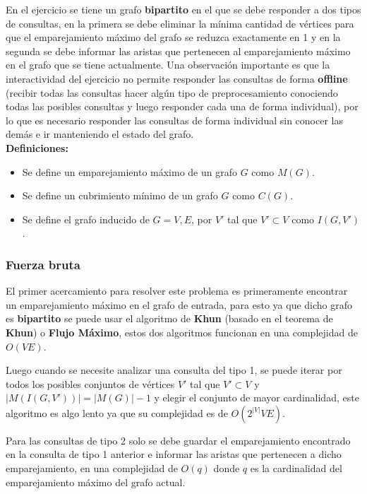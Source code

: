 \documentclass{article}
\begin{document}
En el ejercicio se tiene un grafo \textbf{bipartito} en el que se debe responder a dos tipos de consultas, en la primera
se debe eliminar la mínima cantidad de vértices para que el emparejamiento máximo del grafo se reduzca exactamente en 1 y
en la segunda se debe informar las aristas que pertenecen al emparejamiento máximo en el grafo que se tiene actualmente.
Una observación importante es que la interactividad del ejercicio no permite responder las consultas de forma \textbf{offline}
(recibir todas las consultas hacer algún tipo de preprocesamiento conociendo todas las posibles consultas y luego responder
cada una de forma individual), por lo que es necesario responder las consultas de forma individual sin conocer las demás e ir
manteniendo el estado del grafo.\\

\textbf{Definiciones:}

\begin{itemize}
    \item Se define un emparejamiento máximo de un grafo $G$ como $M(G)$.
    \item Se define un cubrimiento mínimo de un grafo $G$ como $C(G)$.
    \item Se define el grafo inducido de $G=V,E$, por $V'$ tal que $V'\subset V$ como $I(G,V')$.
\end{itemize}

\subsubsection{Fuerza bruta}

El primer acercamiento para resolver este problema es primeramente encontrar un emparejamiento máximo en el grafo de entrada,
para esto ya que dicho grafo es \textbf{bipartito} se puede usar el algoritmo de \textbf{Khun} (basado en el teorema de \textbf{Khun})
o \textbf{Flujo Máximo}, estos dos algoritmos funcionan en una complejidad de $O(V E)$.

Luego cuando se necesite analizar una consulta del tipo 1, se puede iterar por todos los posibles conjuntos de vértices $V'$ tal que
$V' \subset V$ y $|M(I(G,V'))|=|M(G)|-1$ y elegir el conjunto de mayor cardinalidad, este algoritmo es algo lento ya que su complejidad es de $O(2^{|V|}V E)$.

Para las consultas de tipo 2 solo se debe guardar el emparejamiento encontrado en la consulta de tipo 1 anterior e informar
las aristas que pertenecen a dicho emparejamiento, en una complejidad de $O(q)$ donde $q$ es la cardinalidad del emparejamiento máximo del grafo actual.
\end{document}
